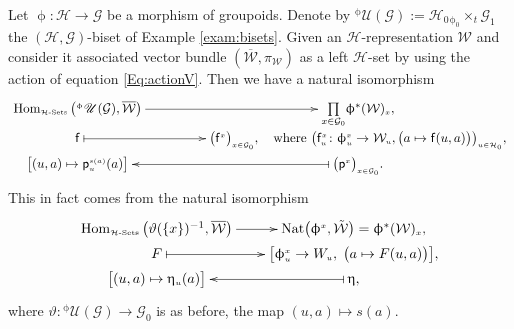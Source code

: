\documentclass[pdftex]{sigma}
\numberwithin{equation}{section}
\renewcommand{\hom}[3]{\mathrm{Hom}_{\Sscript{#1}}\left(#2, #3\right)}
\newcommand{\bara}[1]{\overline{#1}}
\newcommand{\Go}{\cG_{\Sscript{0}}}
\newcommand{\Ga}{\cG_{\Sscript{1}}}
\newcommand{\Ho}{\cH_{\Sscript{0}}}
\newcommand{\Wu}{\cW_{\Sscript{u}}}
\newcommand{\uU}{\mathscr{U}}
\newcommand{\cG}{{\mathcal G}}
\newcommand{\cH}{{\mathcal H}}
\newcommand{\cW}{{\mathcal W}}
\newcommand{\Sscript}[1]{\scriptscriptstyle{#1}}
\newcommand{\due}[3]{{}_{{#2 }} {#1}_{{ #3}} }
\begin{document}
\begin{Remark}\label{rem:HomSet} Let $\upphi\colon \cH \to \cG$ be a morphism of groupoids. Denote by ${}^{\Sscript{\upphi}}\uU(\cG):=\Ho \due \times {\Sscript{\upphi_0}}{ \Sscript{t}} \Ga$ the $(\cH,\cG)$-biset of Example \ref{exam:bisets}. Given an $\cH$-representation $\cW$ and consider it associated vector bundle $(\bara{\cW},\pi_{\Sscript{\cW}})$ as a left $\cH$-set by using the action of equation \eqref{Eq:actionV}. Then we have a natural isomorphism
\begin{gather*}
\xymatrix@R=0pt@C=20pt{ \hom{\cH\text{-}{\rm Sets}}{{
}^{\Sscript{\upphi}}\uU(\cG)}{\bara{\cW}} \ar@{->}^-{}[rr] & &
\underset{x \in \Go}{\prod} \upphi^{*}(\cW)_{\Sscript{x}},
\\ {\sf{f}} \ar@{|->}^-{}[rr] & & \big(
{\sf{f}}^{\Sscript{x}}\big)_{\Sscript{x \in \Go}}, \quad \text{where
} \big( {\sf{f}}^{\Sscript{x}}_{\Sscript{u}}\colon
\upphi^{\Sscript{x}}_{\Sscript{u}} \to \Wu, \big(a \mapsto
{\sf{f}}(u,a) \big) \big)_{\Sscript{u \in \Ho}}, \\
\big[ (u,a) \mapsto {\sf{p}}^{\Sscript{s(a)}}_{\Sscript{u}}(a)
\big]& & \big( {\sf{p}}^{\Sscript{x}}\big)_{\Sscript{x \in
\Go}}. \ar@{|->}^-{}[ll] }
\end{gather*}
This in fact comes from the natural isomorphism
\begin{gather*}
\xymatrix@R=0pt@C=20pt{ \hom{\cH\text{-}{\rm Sets}} {\vartheta(\{ x
\})^{-1}}{\bara{\cW}} \ar@{->}^-{}[r] & {\rm
Nat}\big(\upphi^{\Sscript{x}}, \tilde{\cW}\big) =
\upphi^{*}(\cW)_{\Sscript{x}},
\\ F \ar@{|->}^-{}[r] & \big[\upphi^{\Sscript{x}}_{\Sscript{u}} \to
W_{\Sscript{u}},\; \big( a \mapsto F(u, a)\big)\big], \\
\big[ (u,a) \mapsto \upeta_{\Sscript{u}}(a)\big] & \upeta,
\ar@{|->}^-{}[l] }
\end{gather*}
where $\vartheta\colon { }^{\Sscript{\upphi}}\uU(\cG) \to \Go$ is as before, the map $(u,a) \mapsto s(a)$.
\end{Remark}
\end{document}

